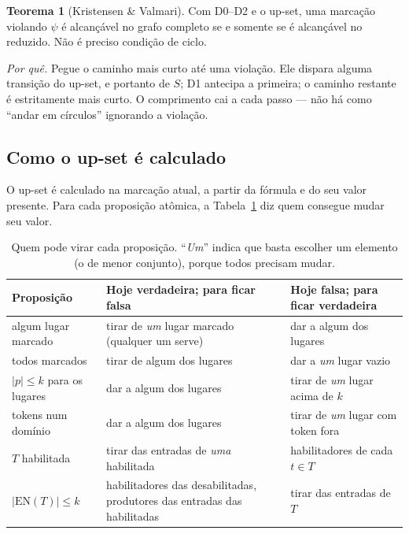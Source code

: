 \documentclass[11pt,a4paper]{report}
\theoremstyle{definition}
\newtheorem{teorema}{Teorema}[chapter]
\begin{document}
\begin{teorema}[Kristensen \& Valmari]
Com D0--D2 e o up-set, uma marcação violando $\psi$ é alcançável no grafo
completo se e somente se é alcançável no reduzido. Não é preciso condição de
ciclo.
\end{teorema}

\emph{Por quê.} Pegue o caminho mais curto até uma violação. Ele dispara
alguma transição do up-set, e portanto de $S$; D1 antecipa a primeira; o
caminho restante é estritamente mais curto. O comprimento cai a cada passo ---
não há como ``andar em círculos'' ignorando a violação.

\subsection*{Como o up-set é calculado}

O up-set é calculado na marcação atual, a partir da fórmula e do seu valor
presente. Para cada proposição atômica, a Tabela~\ref{tab:upset} diz quem
consegue mudar seu valor.

\begin{table}[ht]
\centering\small
\begin{tabular}{>{\raggedright\arraybackslash}p{3.1cm}>{\raggedright\arraybackslash}p{4.6cm}>{\raggedright\arraybackslash}p{4.4cm}}
\toprule
Proposição & Hoje verdadeira; para ficar falsa & Hoje falsa; para ficar verdadeira \\
\midrule
algum lugar marcado & tirar de \emph{um} lugar marcado (qualquer um serve) & dar a algum dos lugares \\
todos marcados & tirar de algum dos lugares & dar a \emph{um} lugar vazio \\
$|p|\le k$ para os lugares & dar a algum dos lugares & tirar de \emph{um} lugar acima de $k$ \\
tokens num domínio & dar a algum dos lugares & tirar de \emph{um} lugar com token fora \\
$T$ habilitada & tirar das entradas de \emph{uma} habilitada & habilitadores de cada $t\in T$ \\
$|\mathrm{EN}(T)|\le k$ & habilitadores das desabilitadas, produtores das entradas das habilitadas & tirar das entradas de $T$ \\
\bottomrule
\end{tabular}
\caption{Quem pode virar cada proposição. ``\emph{Um}'' indica que basta
escolher um elemento (o de menor conjunto), porque todos precisam mudar.}
\label{tab:upset}
\end{table}
\end{document}
